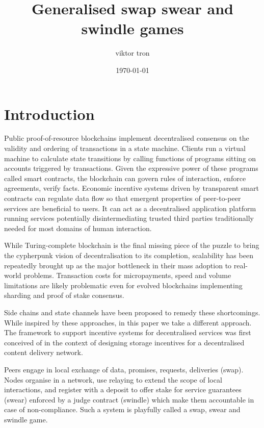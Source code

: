 \documentclass[a4paper,10pt]{article}
\title{Generalised swap swear and swindle games}
\author{viktor tron}
\date{\today}
\begin{document}
\maketitle
 \begin{abstract}


   \end{abstract}

\tableofcontents

\section{Introduction}
Public proof-of-resource blockchains implement decentralised consensus on the validity and ordering of
transactions in a state machine. Clients run a virtual machine to calculate state transitions by calling
functions of programs sitting on accounts triggered by transactions. Given the expressive power of
these programs called smart contracts, the blockchain can
govern rules of interaction, enforce agreements, verify facts.
Economic incentive systems driven by transparent smart contracts can regulate data flow
so that emergent properties of peer-to-peer services are beneficial to users.
It can act as a decentralised application platform running services potentially
disintermediating trusted third parties traditionally needed for most domains of human interaction.

While Turing-complete blockchain is the final missing piece of the puzzle to bring the cypherpunk vision
of decentralisation to its completion, scalability has been repeatedly brought up as the major bottleneck
in their mass adoption to real-world problems. Transaction costs for micropayments,
speed and volume limitations are likely problematic even for evolved blockchains
implementing sharding and proof of stake consensus.

Side chains and state channels have been proposed to remedy these shortcomings.
While inspired by these approaches, in this paper we take a different approach.
The framework to support incentive systems for decentralised services
was first conceived of in the context of designing storage incentives
for a decentralised content delivery network.

Peers engage in local exchange of data, promises, requests, deliveries (swap).
Nodes organise in a network, use relaying
to extend the scope of local interactions, and register with a deposit
to offer stake for service guarantees (swear) enforced by a judge contract (swindle)
which make them accountable in case of non-compliance.
Such a system is playfully called a swap, swear and swindle game.
\end{document}
